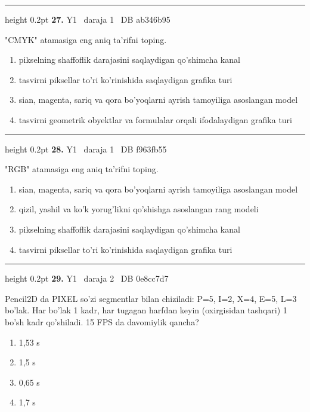\documentclass[10pt,a4paper,oneside]{article}
\begin{document}
\vspace{2mm}\hrule height 0.2pt \vspace{4mm}
\hypertarget{q27}{\textbf{\color{ink}27.}}  {\color{muted}\scriptsize Y1 \textbullet\ daraja 1 \textbullet\ DB ab346b95}
\par
"CMYK" atamasiga eng aniq ta'rifni toping.
\begin{enumerate}[label=\Alph*),leftmargin=9mm]
\item pikselning shaffoflik darajasini saqlaydigan qo'shimcha kanal
\item tasvirni piksellar to'ri ko'rinishida saqlaydigan grafika turi
\item sian, magenta, sariq va qora bo'yoqlarni ayrish tamoyiliga asoslangan model
\item tasvirni geometrik obyektlar va formulalar orqali ifodalaydigan grafika turi
\end{enumerate}
\vspace{2mm}\hrule height 0.2pt \vspace{4mm}
\hypertarget{q28}{\textbf{\color{ink}28.}}  {\color{muted}\scriptsize Y1 \textbullet\ daraja 1 \textbullet\ DB f963fb55}
\par
"RGB" atamasiga eng aniq ta'rifni toping.
\begin{enumerate}[label=\Alph*),leftmargin=9mm]
\item sian, magenta, sariq va qora bo'yoqlarni ayrish tamoyiliga asoslangan model
\item qizil, yashil va ko'k yorug'likni qo'shishga asoslangan rang modeli
\item pikselning shaffoflik darajasini saqlaydigan qo'shimcha kanal
\item tasvirni piksellar to'ri ko'rinishida saqlaydigan grafika turi
\end{enumerate}
\vspace{2mm}\hrule height 0.2pt \vspace{4mm}
\hypertarget{q29}{\textbf{\color{ink}29.}}  {\color{muted}\scriptsize Y1 \textbullet\ daraja 2 \textbullet\ DB 0e8cc7d7}
\par
Pencil2D da PIXEL so'zi segmentlar bilan chiziladi: P=5, I=2, X=4, E=5, L=3 bo'lak. Har bo'lak 1 kadr, har tugagan harfdan keyin (oxirgisidan tashqari) 1 bo'sh kadr qo'shiladi. 15 FPS da davomiylik qancha?
\begin{enumerate}[label=\Alph*),leftmargin=9mm]
\item 1,53 s
\item 1,5 s
\item 0,65 s
\item 1,7 s
\end{enumerate}
\end{document}
